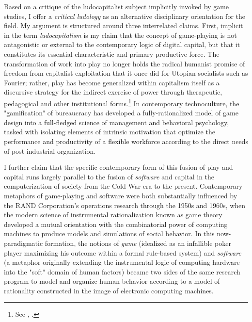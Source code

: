 Based on a critique of the ludocapitalist subject implicitly invoked by game studies, I offer a \emph{critical ludology} as an alternative disciplinary orientation for the field. My argument is structured around three interrelated claims. First, implicit in the term \emph{ludocapitalism} is my claim that the concept of game-playing is not antagonistic or external to the contemporary logic of digital capital, but that it constitutes its essential characteristic and primary productive force. The transformation of work into play no longer holds the radical humanist promise of freedom from capitalist exploitation that it once did for Utopian socialists such as Fourier; rather, play has become generalized within capitalism itself as a discursive strategy for the indirect exercise of power through therapeutic, pedagogical and other institutional forms.\footnote{ See \citeauthor{Andersen2009-yx}, .} In contemporary technoculture, the "gamification" of bureaucracy has developed a fully-rationalized model of game design into a full-fledged science of management and behavioral psychology, tasked with isolating elements of intrinsic motivation that optimize the performance and productivity of a flexible workforce according to the direct needs of post-industrial organization.

I further claim that the specific contemporary form of this fusion of play and capital runs largely parallel to the fusion of \emph{software} and capital in the computerization of society from the Cold War era to the present. Contemporary metaphors of game-playing and software were both substantially influenced by the RAND Corporation's operations research through the 1950s and 1960s, when the modern science of instrumental rationalization known as game theory developed a mutual orientation with the combinatorial power of computing machines to produce models and simulations of social behavior. In this now-paradigmatic formation, the notions of \emph{game} (idealized as an infallible poker player maximizing his outcome within a formal rule-based system) and \emph{software} (a metaphor originally extending the instrumental logic of computing hardware into the "soft" domain of human factors) became two sides of the same research program to model and organize human behavior according to a model of rationality constructed in the image of electronic computing machines.

